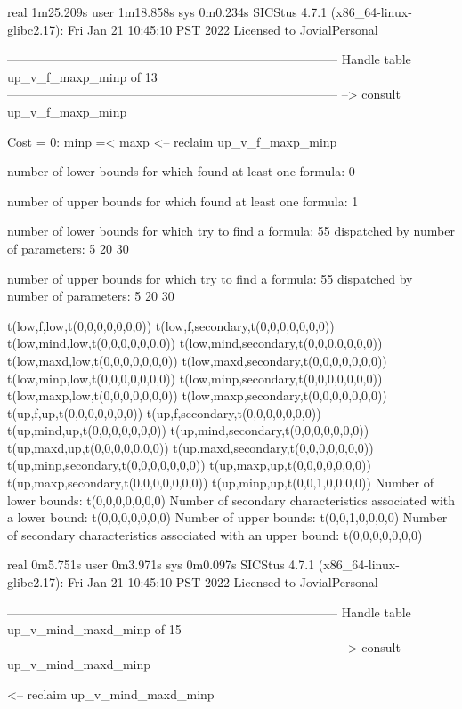 real	1m25.209s
user	1m18.858s
sys	0m0.234s
SICStus 4.7.1 (x86_64-linux-glibc2.17): Fri Jan 21 10:45:10 PST 2022
Licensed to JovialPersonal


--------------------------------------------------------------------------------
Handle table up_v_f_maxp_minp of 13
--------------------------------------------------------------------------------
--> consult up_v_f_maxp_minp

Cost =  0:  minp =< maxp
<-- reclaim up_v_f_maxp_minp

number of lower bounds for which found at least one formula: 0

number of upper bounds for which found at least one formula: 1

number of lower bounds for which try to find a formula: 55
dispatched by number of parameters: 5  20  30

number of upper bounds for which try to find a formula: 55
dispatched by number of parameters: 5  20  30

t(low,f,low,t(0,0,0,0,0,0,0))
t(low,f,secondary,t(0,0,0,0,0,0,0))
t(low,mind,low,t(0,0,0,0,0,0,0))
t(low,mind,secondary,t(0,0,0,0,0,0,0))
t(low,maxd,low,t(0,0,0,0,0,0,0))
t(low,maxd,secondary,t(0,0,0,0,0,0,0))
t(low,minp,low,t(0,0,0,0,0,0,0))
t(low,minp,secondary,t(0,0,0,0,0,0,0))
t(low,maxp,low,t(0,0,0,0,0,0,0))
t(low,maxp,secondary,t(0,0,0,0,0,0,0))
t(up,f,up,t(0,0,0,0,0,0,0))
t(up,f,secondary,t(0,0,0,0,0,0,0))
t(up,mind,up,t(0,0,0,0,0,0,0))
t(up,mind,secondary,t(0,0,0,0,0,0,0))
t(up,maxd,up,t(0,0,0,0,0,0,0))
t(up,maxd,secondary,t(0,0,0,0,0,0,0))
t(up,minp,secondary,t(0,0,0,0,0,0,0))
t(up,maxp,up,t(0,0,0,0,0,0,0))
t(up,maxp,secondary,t(0,0,0,0,0,0,0))
t(up,minp,up,t(0,0,1,0,0,0,0))
Number of lower bounds:                                             t(0,0,0,0,0,0,0)
Number of secondary characteristics associated with a lower bound:  t(0,0,0,0,0,0,0)
Number of upper bounds:                                             t(0,0,1,0,0,0,0)
Number of secondary characteristics associated with an upper bound: t(0,0,0,0,0,0,0)

real	0m5.751s
user	0m3.971s
sys	0m0.097s
SICStus 4.7.1 (x86_64-linux-glibc2.17): Fri Jan 21 10:45:10 PST 2022
Licensed to JovialPersonal


--------------------------------------------------------------------------------
Handle table up_v_mind_maxd_minp of 15
--------------------------------------------------------------------------------
--> consult up_v_mind_maxd_minp

<-- reclaim up_v_mind_maxd_minp

